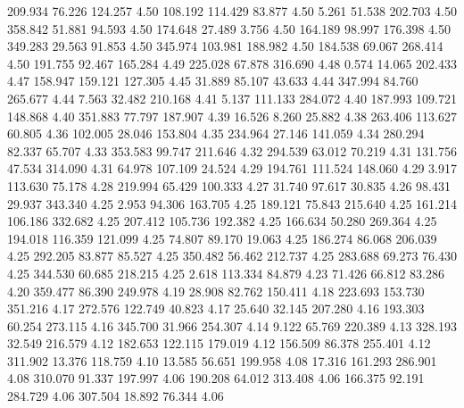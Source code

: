  209.934   76.226  124.257         4.50
 108.192  114.429   83.877         4.50
   5.261   51.538  202.703         4.50
 358.842   51.881   94.593         4.50
 174.648   27.489    3.756         4.50
 164.189   98.997  176.398         4.50
 349.283   29.563   91.853         4.50
 345.974  103.981  188.982         4.50
 184.538   69.067  268.414         4.50
 191.755   92.467  165.284         4.49
 225.028   67.878  316.690         4.48
   0.574   14.065  202.433         4.47
 158.947  159.121  127.305         4.45
  31.889   85.107   43.633         4.44
 347.994   84.760  265.677         4.44
   7.563   32.482  210.168         4.41
   5.137  111.133  284.072         4.40
 187.993  109.721  148.868         4.40
 351.883   77.797  187.907         4.39
  16.526    8.260   25.882         4.38
 263.406  113.627   60.805         4.36
 102.005   28.046  153.804         4.35
 234.964   27.146  141.059         4.34
 280.294   82.337   65.707         4.33
 353.583   99.747  211.646         4.32
 294.539   63.012   70.219         4.31
 131.756   47.534  314.090         4.31
  64.978  107.109   24.524         4.29
 194.761  111.524  148.060         4.29
   3.917  113.630   75.178         4.28
 219.994   65.429  100.333         4.27
  31.740   97.617   30.835         4.26
  98.431   29.937  343.340         4.25
   2.953   94.306  163.705         4.25
 189.121   75.843  215.640         4.25
 161.214  106.186  332.682         4.25
 207.412  105.736  192.382         4.25
 166.634   50.280  269.364         4.25
 194.018  116.359  121.099         4.25
  74.807   89.170   19.063         4.25
 186.274   86.068  206.039         4.25
 292.205   83.877   85.527         4.25
 350.482   56.462  212.737         4.25
 283.688   69.273   76.430         4.25
 344.530   60.685  218.215         4.25
   2.618  113.334   84.879         4.23
  71.426   66.812   83.286         4.20
 359.477   86.390  249.978         4.19
  28.908   82.762  150.411         4.18
 223.693  153.730  351.216         4.17
 272.576  122.749   40.823         4.17
  25.640   32.145  207.280         4.16
 193.303   60.254  273.115         4.16
 345.700   31.966  254.307         4.14
   9.122   65.769  220.389         4.13
 328.193   32.549  216.579         4.12
 182.653  122.115  179.019         4.12
 156.509   86.378  255.401         4.12
 311.902   13.376  118.759         4.10
  13.585   56.651  199.958         4.08
  17.316  161.293  286.901         4.08
 310.070   91.337  197.997         4.06
 190.208   64.012  313.408         4.06
 166.375   92.191  284.729         4.06
 307.504   18.892   76.344         4.06
